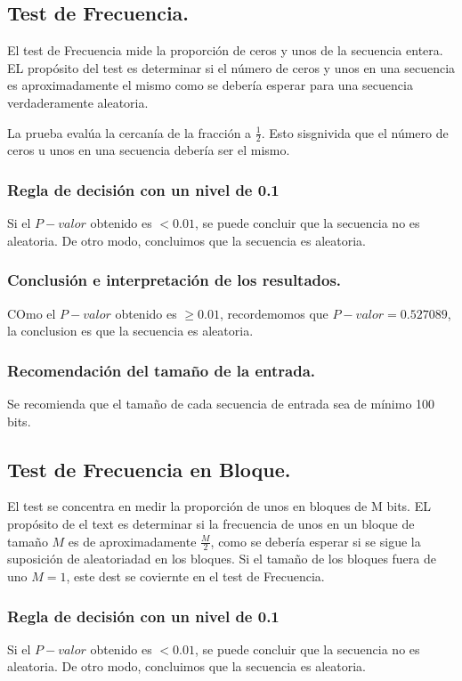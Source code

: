\documentclass{llncs}
\theoremstyle{plane}
\begin{document}
\subsection{Test de Frecuencia.}
El test de Frecuencia mide la proporción de ceros y unos de la secuencia entera. EL propósito del test es determinar si el número de ceros y unos en una secuencia es aproximadamente el mismo  como se debería esperar para una secuencia verdaderamente aleatoria.

La prueba evalúa la cercanía de la fracción  a $\frac{1}{2}$. Esto sisgnivida que el número de ceros u unos en una secuencia debería ser el mismo. 

\subsubsection{Regla de decisión con un nivel de 0.1}
Si el $P-valor$ obtenido es $<0.01$, se puede concluir que la secuencia no es aleatoria. De otro modo, concluimos que la secuencia es aleatoria.
\subsubsection{Conclusión e interpretación de los resultados.}
COmo el $P-valor$ obtenido es $\geq 0.01$, recordemomos que $P-valor =0.527089$, la conclusion es que la secuencia es aleatoria.
\subsubsection{Recomendación del tamaño de la entrada.}
Se recomienda que el tamaño de cada secuencia de entrada sea de mínimo 100 bits.


\subsection{Test de Frecuencia en Bloque.}
El test se concentra en medir la proporción de unos en bloques de M bits. EL propósito de el text es determinar si la frecuencia de unos en un bloque de tamaño $M$ es de aproximadamente $\frac{M}{2}$, como se debería esperar si se sigue la suposición de aleatoriadad en los bloques. Si el tamaño de los bloques fuera de uno $M=1$, este dest se coviernte en el test de Frecuencia.

\subsubsection{Regla de decisión con un nivel de 0.1}
Si el $P-valor$ obtenido es $<0.01$, se puede concluir que la secuencia no es aleatoria. De otro modo, concluimos que la secuencia es aleatoria.
\end{document}

